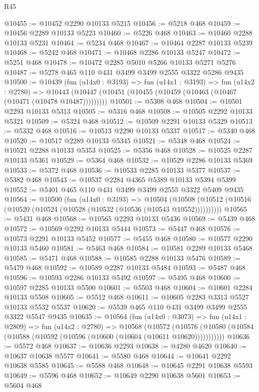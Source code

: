 \begin{lexlean}{R45}
\begin{coremodule}
@10455 := @10452 @2290 @10133 @5215
@10456 := @5218 @468
@10459 := @10456 @2289 @10133 @5223
@10460 := @5226 @468
@10463 := @10460 @2288 @10133 @5231
@10464 := @5234 @468
@10467 := @10464 @2287 @10133 @5239
@10468 := @5242 @468
@10471 := @10468 @2286 @10133 @5247
@10472 := @5251 @468
@10478 := @10472 @2285 @5010 @5266 @10133 @5271 @5276
@10487 := @5278 @465 @110 @431 @3499 @3499 @2555 @3322 @5286 @9435
@10500 := @10439
    (fun (u14x0 : @3193) =>
    fun (u14x1 : @3193) =>
    fun (u14x2 : @2780) =>
    @10443 (@10447 (@10451 (@10455 (@10459 (@10463 (@10467 (@10471 (@10478 @10487)))))))))
@10501 := @5308 @468
@10504 := @10501 @2293 @10133 @5313
@10505 := @5316 @468
@10508 := @10505 @2292 @10133 @5321
@10509 := @5324 @468
@10512 := @10509 @2291 @10133 @5329
@10513 := @5332 @468
@10516 := @10513 @2290 @10133 @5337
@10517 := @5340 @468
@10520 := @10517 @2289 @10133 @5345
@10521 := @5348 @468
@10524 := @10521 @2288 @10133 @5353
@10525 := @5356 @468
@10528 := @10525 @2287 @10133 @5361
@10529 := @5364 @468
@10532 := @10529 @2286 @10133 @5369
@10533 := @5372 @468
@10536 := @10533 @2285 @10133 @5377
@10537 := @5382 @468
@10543 := @10537 @2284 @4365 @5389 @10133 @5394 @5399
@10552 := @5401 @465 @110 @431 @3499 @3499 @2555 @3322 @5409 @9435
@10564 := @10500
    (fun (u14x0 : @3193) =>
    @10504 (@10508 (@10512 (@10516 (@10520 (@10524 (@10528 (@10532 (@10536 (@10543 @10552))))))))))
@10565 := @5431 @468
@10568 := @10565 @2293 @10133 @5436
@10569 := @5439 @468
@10572 := @10569 @2292 @10133 @5444
@10573 := @5447 @468
@10576 := @10573 @2291 @10133 @5452
@10577 := @5455 @468
@10580 := @10577 @2290 @10133 @5460
@10581 := @5463 @468
@10584 := @10581 @2289 @10133 @5468
@10585 := @5471 @468
@10588 := @10585 @2288 @10133 @5476
@10589 := @5479 @468
@10592 := @10589 @2287 @10133 @5484
@10593 := @5487 @468
@10596 := @10593 @2286 @10133 @5492
@10597 := @5495 @468
@10600 := @10597 @2285 @10133 @5500
@10601 := @5503 @468
@10604 := @10601 @2284 @10133 @5508
@10605 := @5512 @468
@10611 := @10605 @2283 @3313 @5527 @10133 @5532 @5537
@10620 := @5539 @465 @110 @431 @3499 @3499 @2555 @3322 @5547 @9435
@10635 := @10564
    (fun (u14x0 : @3073) =>
    fun (u14x1 : @2809) =>
    fun (u14x2 : @2780) =>
    @10568
      (@10572
        (@10576 (@10580 (@10584 (@10588 (@10592 (@10596 (@10600 (@10604 (@10611 @10620)))))))))))
@10636 := @5572 @468
@10637 := @10636 @2293
@10638 := @4280 @4620
@10640 := @10637 @10638 @5577
@10641 := @5580 @468
@10644 := @10641 @2292 @10638 @5585
@10645 := @5588 @468
@10648 := @10645 @2291 @10638 @5593
@10649 := @5596 @468
@10652 := @10649 @2290 @10638 @5601
@10653 := @5604 @468

\end{coremodule}
\end{lexlean}
